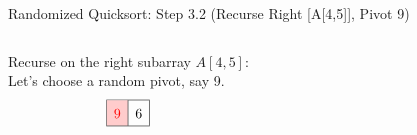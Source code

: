 \begin{frame}{Randomized Quicksort: Step 3.2 (Recurse Right [A[4,5]], Pivot 9)}
  \begin{columns}[t]
    Recurse on the right subarray $A[4,5]$:
    \\[0.5em]
    Let's choose a random pivot, say 9.
    \[
      \renewcommand{\arraystretch}{1.5}
      \begin{array}{|c|c|}
        \hline
        \cellcolor{red!20}\textcolor{red}{9} & 6 \\
        \hline
      \end{array}
    \]
    \pause
    \begin{minipage}[t]{\linewidth}
      \vspace{0pt} %
      \begin{center}


\end{center}
\end{minipage}
\end{columns}
\end{frame}
